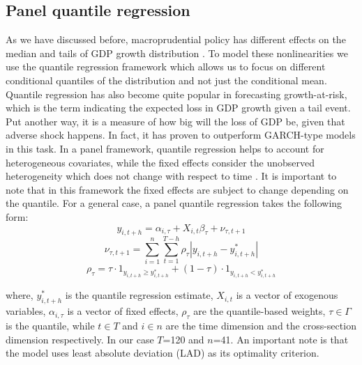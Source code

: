 \documentclass[12pt,a4paper]{article}
\begin{document}
\subsection{Panel quantile regression}
As we have discussed before, macroprudential policy has different effects on the median and tails of GDP growth distribution \citep{boar_2017}. To model these nonlinearities we use the quantile regression framework \citep{koenker_1978_regression} which allows us to focus on different conditional quantiles of the distribution and not just the conditional mean. Quantile regression has also become quite popular in forecasting growth-at-risk, which is the term indicating the expected loss in GDP growth given a tail event. Put another way, it is a measure of how big will the loss of GDP be, given that adverse shock happens. In fact, it has proven to outperform GARCH-type models \citep{kipriyanov_2022} in this task. In a panel framework, quantile regression helps to account for heterogeneous covariates, while the fixed effects consider the unobserved heterogeneity which does not change with respect to time \citep{galan2020}. It is important to note that in this framework the fixed effects are subject to change depending on the quantile. For a general case, a panel quantile regression takes the following form:
\begin{equation}
    \label{eq:panel_qr}
    y_{i,t+h} = \alpha_{i, \tau} + X_{i,t} \beta_\tau + \nu_{\tau,t+1}
\end{equation}
\begin{equation}
    \label{eq:panel_qr_loss}
    \nu_{\tau,t+1} = \sum_{i=1}^n \sum_{t=1}^{T-h}\rho_\tau| y_{i,t+h} -  y_{i,t+h}^*|
\end{equation}
\begin{equation}
    \label{eq:panel_qr_weights}
    \rho_\tau = \tau \cdot 1_{y_{i,t+h} \geq y_{i,t+h}^*} + (1-\tau) \cdot 1_{y_{i,t+h} < y_{i,t+h}^*}
\end{equation}

where, $y_{i,t+h}^*$ is the quantile regression estimate, $X_{i,t}$ is a vector of exogenous variables, $\alpha_{i, \tau}$ is a vector of fixed effects, $\rho_\tau$ are the quantile-based weights, $\tau\in\Gamma$ is the quantile, while $t\in T$ and $i\in n$ are the time dimension and the cross-section dimension respectively. In our case $T$=120 and $n$=41. An important note is that the model uses least absolute deviation (LAD) as its optimality criterion.
\end{document}
